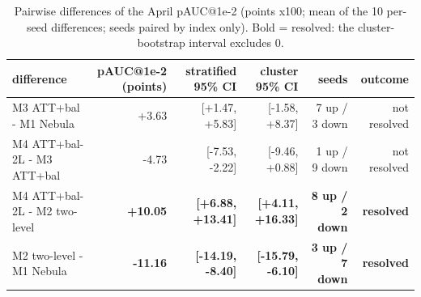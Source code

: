 \begin{table}[t]
\centering
\small
\caption{Pairwise differences of the April pAUC@1e-2 (points x100; mean of the 10 per-seed differences; seeds paired by index only). Bold = resolved: the cluster-bootstrap interval excludes 0.}
\label{tab:T7_pairwise_differences}
\begin{tabular}{lrrrrr}
\toprule
difference & pAUC@1e-2 (points) & stratified 95\% CI & cluster 95\% CI & seeds & outcome \\
\midrule
M3 ATT+bal - M1 Nebula & +3.63 & [+1.47, +5.83] & [-1.58, +8.37] & 7 up / 3 down & not resolved \\
M4 ATT+bal-2L - M3 ATT+bal & -4.73 & [-7.53, -2.22] & [-9.46, +0.88] & 1 up / 9 down & not resolved \\
M4 ATT+bal-2L - M2 two-level & \textbf{+10.05} & \textbf{[+6.88, +13.41]} & \textbf{[+4.11, +16.33]} & \textbf{8 up / 2 down} & \textbf{resolved} \\
M2 two-level - M1 Nebula & \textbf{-11.16} & \textbf{[-14.19, -8.40]} & \textbf{[-15.79, -6.10]} & \textbf{3 up / 7 down} & \textbf{resolved} \\
\bottomrule
\end{tabular}
\end{table}
